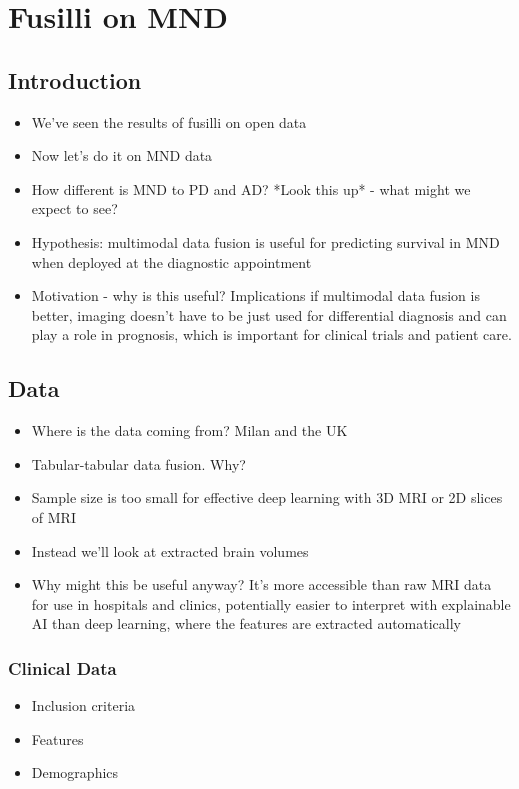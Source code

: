 \chapter{Fusilli on MND}
\label{fusilli_on_mnd}

\section{Introduction}
\begin{itemize}
    \item We've seen the results of fusilli on open data
    \item Now let's do it on MND data
    \item How different is MND to PD and AD? *Look this up* - what might we expect to see?
    \item Hypothesis: multimodal data fusion is useful for predicting survival in MND when deployed at the diagnostic appointment
    \item Motivation - why is this useful? Implications if multimodal data fusion is better, imaging doesn't have to be just used for differential diagnosis and can play a role in prognosis, which is important for clinical trials and patient care.
\end{itemize}

\section{Data}
\begin{itemize}
    \item Where is the data coming from? Milan and the UK
    \item Tabular-tabular data fusion. Why?
    \item Sample size is too small for effective deep learning with 3D MRI or 2D slices of MRI
    \item Instead we'll look at extracted brain volumes
    \item Why might this be useful anyway? It's more accessible than raw MRI data for use in hospitals and clinics, potentially easier to interpret with explainable AI than deep learning, where the features are extracted automatically
\end{itemize}

\subsection{Clinical Data}
\begin{itemize}
    \item Inclusion criteria
    \item Features
    \item Demographics
\end{itemize}

